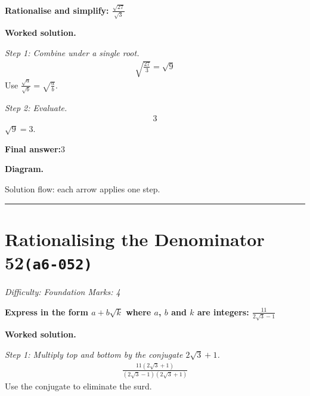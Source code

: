 \documentclass[11pt]{article}
\newcommand{\question}[1]{\par\medskip\noindent\textbf{#1}\par}
\begin{document}
\question{Rationalise and simplify: \( \frac{\sqrt{27}}{\sqrt{3}} \)}

\textbf{Worked solution.}

\textit{Step 1: Combine under a single root.}
\[\begin{gathered}
\sqrt{\frac{27}{3}} = \sqrt{9}
\end{gathered}\]
Use \( \frac{\sqrt{a}}{\sqrt{b}} = \sqrt{\frac{a}{b}} \).

\textit{Step 2: Evaluate.}
\[\begin{gathered}
3
\end{gathered}\]
\( \sqrt{9} = 3 \).

\begin{answerbox}
\textbf{Final answer:}\quad \(\displaystyle 3\)
\end{answerbox}
\textbf{Diagram.}

\begin{center}
\end{center}
\small Solution flow: each arrow applies one step.\normalsize

\medskip\hrule

\section*{Rationalising the Denominator 52\quad\small\texttt{(a6-052)}}
\textit{Difficulty: Foundation \quad\textbar\quad Marks: 4}

\question{Express in the form \( a + b\sqrt{k} \) where \( a \), \( b \) and \( k \) are integers: \( \frac{11}{2\sqrt{3} - 1} \)}

\textbf{Worked solution.}

\textit{Step 1: Multiply top and bottom by the conjugate \( 2\sqrt{3} + 1 \).}
\[\begin{gathered}
\frac{11(2\sqrt{3} + 1)}{(2\sqrt{3} - 1)(2\sqrt{3} + 1)}
\end{gathered}\]
Use the conjugate to eliminate the surd.
\end{document}
